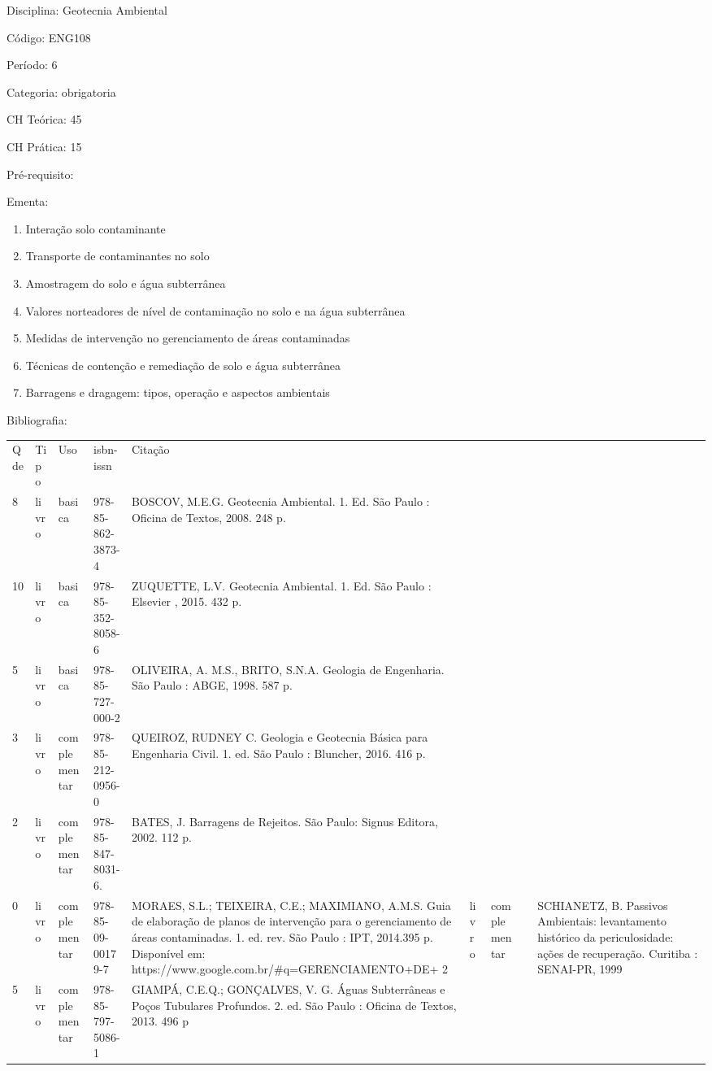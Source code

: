 \documentclass[12pt,a4paper,twoside]{report}
\begin{document}
Disciplina: Geotecnia Ambiental

Código: ENG108

Período: 6

Categoria: obrigatoria

CH Teórica: 45

CH Prática: 15




Pré-requisito:
\begin{enumerate}
\end{enumerate}

Ementa:
\begin{enumerate}
\item Interação solo contaminante
\item Transporte de contaminantes no solo
\item Amostragem do solo e água subterrânea
\item Valores norteadores de nível de contaminação no solo e na água subterrânea
\item Medidas de intervenção no gerenciamento de áreas contaminadas
\item Técnicas de contenção e remediação de solo e água subterrânea
\item Barragens e dragagem: tipos, operação e aspectos ambientais
\end{enumerate}



Bibliografia:


\begin{tabular}{llllp{8cm}}
Qde & Tipo & Uso & isbn-issn & Citação \\
8&livro&basica&978-85-862-3873-4&BOSCOV, M.E.G. Geotecnia Ambiental. 1. Ed. São Paulo : Oficina de Textos, 2008. 248 p.\\
10&livro&basica&978-85-352-8058-6&ZUQUETTE, L.V. Geotecnia Ambiental. 1. Ed. São Paulo : Elsevier , 2015. 432 p.\\
5&livro&basica&978-85-727-000-2&OLIVEIRA, A. M.S., BRITO, S.N.A. Geologia de Engenharia. São Paulo : ABGE, 1998. 587 p.\\
3&livro&complementar&978-85-212-0956-0&QUEIROZ, RUDNEY C. Geologia e Geotecnia Básica para Engenharia Civil. 1. ed. São Paulo : Bluncher, 2016. 416 p.\\
2&livro&complementar&978-85-847-8031-6.&BATES, J.  Barragens de Rejeitos. São Paulo: Signus Editora, 2002. 112 p.\\
0&livro&complementar&978-85-09-00179-7&MORAES, S.L.; TEIXEIRA, C.E.; MAXIMIANO, A.M.S. Guia de elaboração de planos de intervenção para o gerenciamento de áreas contaminadas. 1. ed. rev. São Paulo : IPT, 2014.395 p. Disponível em: https://www.google.com.br/#q=GERENCIAMENTO+DE+%
2&livro&complementar&&SCHIANETZ, B. Passivos Ambientais: levantamento histórico da periculosidade: ações de recuperação. Curitiba : SENAI-PR, 1999\\
5&livro&complementar&978-85-797-5086-1&GIAMPÁ, C.E.Q.; GONÇALVES, V. G. Águas Subterrâneas e Poços Tubulares Profundos. 2. ed. São Paulo : Oficina de Textos, 2013. 496 p\\
\end{tabular}
\end{document}
